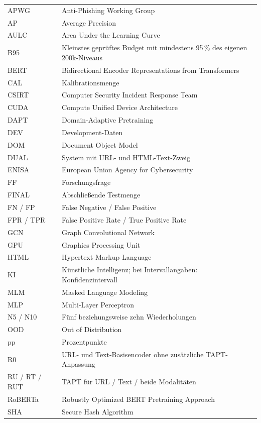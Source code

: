 \begingroup\small{}
\begin{longtable}{@{}p{}p{}@{}}
APWG & Anti-Phishing Working Group\\
AP & Average Precision\\
AULC & Area Under the Learning Curve\\
B95 & Kleinstes geprüftes Budget mit mindestens 95\,\% des eigenen 200k-Niveaus\\
BERT & Bidirectional Encoder Representations from Transformers\\
CAL & Kalibrationsmenge\\
CSIRT & Computer Security Incident Response Team\\
CUDA & Compute Unified Device Architecture\\
DAPT & Domain-Adaptive Pretraining\\
DEV & Development-Daten\\
DOM & Document Object Model\\
DUAL & System mit URL- und HTML-Text-Zweig\\
ENISA & European Union Agency for Cybersecurity\\
FF & Forschungsfrage\\
FINAL & Abschließende Testmenge\\
FN / FP & False Negative / False Positive\\
FPR / TPR & False Positive Rate / True Positive Rate\\
GCN & Graph Convolutional Network\\
GPU & Graphics Processing Unit\\
HTML & Hypertext Markup Language\\
KI & Künstliche Intelligenz; bei Intervallangaben: Konfidenzintervall\\
MLM & Masked Language Modeling\\
MLP & Multi-Layer Perceptron\\
N5 / N10 & Fünf beziehungsweise zehn Wiederholungen\\
OOD & Out of Distribution\\
pp & Prozentpunkte\\
R0 & URL- und Text-Basisencoder ohne zusätzliche TAPT-Anpassung\\
RU / RT / RUT & TAPT für URL / Text / beide Modalitäten\\
RoBERTa & Robustly Optimized BERT Pretraining Approach\\
SHA & Secure Hash Algorithm\\

\end{longtable}
